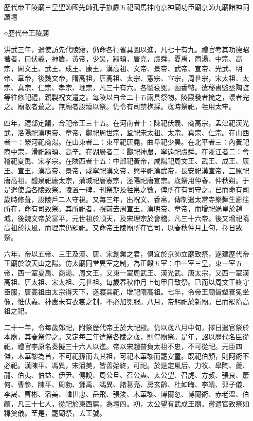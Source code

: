 歷代帝王陵廟三皇聖師國先師孔子旗纛五祀國馬神南京神廟功臣廟京師九廟諸神祠厲壇

○歷代帝王陵廟

洪武三年，遣使訪先代陵寢，仍命各行省具圖以進，凡七十有九。禮官考其功德昭著者，曰伏羲，神農，黃帝，少昊，顓頊，唐堯，虞舜，夏禹，商湯、中宗、高宗，周文王、武王、成王、康王，漢高祖、文帝、景帝、武帝、宣帝、光武、明帝、章帝，後魏文帝，隋高祖，唐高祖、太宗、憲宗、宣宗，周世宗，宋太祖、太宗、真宗、仁宗、孝宗、理宗，凡三十有六。各製袞冕，函香幣。遣秘書監丞陶誼等往修祀禮，親製祝文遣之。每陵以白金二十五兩具祭物。陵寢發者掩之，壞者完之。廟敝者葺之。無廟者設壇以祭。仍令有司禁樵採。歲時祭祀，牲用太牢。

四年，禮部定議，合祀帝王三十五。在河南者十：陳祀伏羲、商高宗，孟津祀漢光武，洛陽祀漢明帝、章帝，鄭祀周世宗，鞏祀宋太祖、太宗、真宗、仁宗。在山西者一：滎河祀商湯。在山東者二：東平祀唐堯，曲阜祀少昊。在北平者三：內黃祀商中宗，滑祀顓頊、高辛。在湖廣者二：酃祀神農，寧遠祀虞舜。在浙江者二：會稽祀夏禹、宋孝宗。在陜西者十五：中部祀黃帝，咸陽祀周文王、武王、成王、康王、宣王，漢高帝、景帝，咸寧祀漢文帝，興平祀漢武帝，長安祀漢宣帝，三原祀唐高祖，醴泉祀唐太宗，蒲城祀唐憲宗，涇陽祀唐宣宗。歲祭用仲春、仲秋朔。于是遣使詣各陵致祭。陵置一碑，刊祭期及牲帛之數，俾所在有司守之。已而命有司歲時修葺，設陵戶二人守視。又每三年，出祝文、香帛，傳制遣太常寺樂舞生齎往所在，命有司致祭。其所祀者，視前去周宣王，漢明帝、章帝，而增祀媧皇於趙城，後魏文帝於富平，元世祖於順天，及宋理宗於會稽，凡三十六帝。後又增祀隋高祖於扶風，而理宗仍罷祀。又命帝王陵廟所在官司，以春秋仲月上旬，擇日致祭。

六年，帝以五帝、三王及漢、唐、宋創業之君，俱宜於京師立廟致祭，遂建歷代帝王廟於欽天山之陽。仿太廟同堂異室之制，為正殿五室：中一室三皇，東一室五帝，西一室夏禹、商湯、周文王，又東一室周武王、漢光武、唐太宗，又西一室漢高祖、唐太祖、宋太祖、元世祖。每歲春秋仲月上旬甲日致祭。已而以周文王終守臣服，唐高祖由太宗得天下，遂寢其祀，增祀隋高祖。七年，令帝王廟皆塑袞冕坐像，惟伏羲、神農未有衣裳之制，不必加冕服。八月，帝躬祀於新廟。已而罷隋高祖之祀。

二十一年，令每歲郊祀，附祭歷代帝王於大祀殿。仍以歲八月中旬，擇日遣官祭於本廟，其春祭停之。又定每三年遣祭各陵之歲，則停廟祭。是年，詔以歷代名臣從祀，禮官李原名奏擬三十六人以進。帝以宋趙普負太祖不忠，不可從祀。元臣四傑，木華黎為首，不可祀孫而去其祖，可祀木華黎而罷安童。既祀伯顏，則阿術不必祀。漢陳平、馮異，宋潘美，皆善始終，可祀。於是定風后、力牧、皋陶、夔、龍、伯夷、伯益、伊尹、傅說、周公旦、召公奭、太公望、召虎、方叔、張良、蕭何、曹參、陳平、周勃、鄧禹、馮異、諸葛亮、房玄齡、杜如晦、李靖、郭子儀、李晟、曹彬、潘美、韓世忠、岳飛、張浚、木華黎、博爾忽、博爾術、赤老溫、伯顏，凡三十七人，從祀於東西廡，為壇四。初，太公望有武成王廟。嘗遣官致祭如釋奠儀。至是，罷廟祭，去王號。

